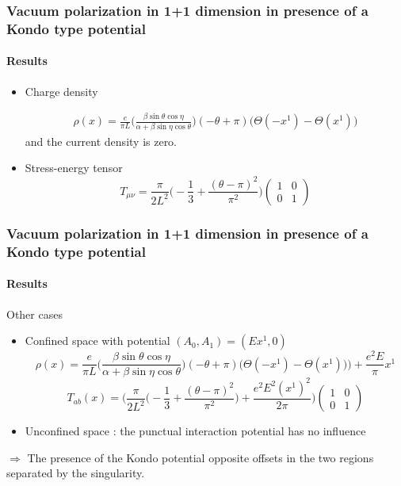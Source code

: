 \documentclass[french]{beamer}
\begin{document}
\begin{frame}
\frametitle{Vacuum polarization in 1+1 dimension in presence of a Kondo type potential}
\framesubtitle{Results}

\begin{itemize}

\item Charge density

\begin{equation*}
\begin{split}
\rho(x) = \frac{e}{\pi L}\Big( \frac{\beta \sin \theta \cos \eta}{\alpha + \beta \sin \eta \cos \theta}\Big) (-\theta + \pi) \Big( \Theta(-x^1) - \Theta(x^1)\Big)
\end{split}
\end{equation*}
and the current density is zero. 

\item Stress-energy tensor
\begin{equation*}
T_{\mu\nu} = \frac{ \pi}{2 L^2} \big( -\frac{1}{3} + \frac{(\theta - \pi)^2}{\pi^2}\big)\begin{pmatrix}
1  & 0 \\ 0  &  1
\end{pmatrix}
\end{equation*}
\end{itemize}

\end{frame}
\begin{frame}[shrink=5]
\frametitle{Vacuum polarization in 1+1 dimension in presence of a Kondo type potential}
\framesubtitle{Results}

Other cases
\begin{itemize}
\item Confined space with potential $(A_0, A_1) = (Ex^1, 0)$
\begin{equation*}
\rho(x) = \frac{e}{\pi L}\Big( \frac{\beta \sin \theta \cos \eta}{\alpha + \beta \sin \eta \cos \theta}\Big) (-\theta + \pi)
\Big(\Theta(- x^1) - \Theta(x^1))\Big) + \frac{e^2 E}{\pi} x^1
\end{equation*}
\begin{equation*}
T_{ab}(x) = 
\bigg( \frac{\pi}{2L^2}\big( -\frac{1}{3} + \frac{(\theta - \pi)^2}{\pi^2}\big) + \frac{e^2E^2(x^1)^2}{2 \pi} \bigg)
\begin{pmatrix}
1 & 0 \\ 0 & 1
\end{pmatrix}
\end{equation*}

\item Unconfined space : the punctual interaction potential has no influence

\end{itemize}

$\Longrightarrow$ The presence of the Kondo potential opposite offsets in the two regions separated by the singularity. 

\end{frame}
\end{document}
